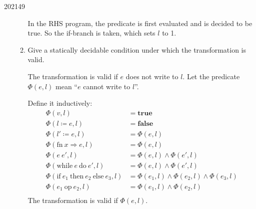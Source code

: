 \documentclass[10pt,\jkfside,a4paper]{article}
\begin{document}
\begin{examquestion}{2021}{4}{9}
\begin{enumerate}
\begin{enumerate}
In the RHS program, the predicate is first evaluated and is decided to be
true. So the if-branch is taken, which sets $l$ to 1.

\item Give a statically decidable condition under which the transformation
is valid.

The transformation is valid if $e$ does not write to $l$. Let the predicate
$\Phi(e, l)$ mean ``$e$ cannot write to $l$''.

Define it inductively:
\begin{align*}
\Phi(v, l) &= \mathbf{true} \\
\Phi(l \coloneqq e, l) &= \mathbf{false} \\
\Phi(l' \coloneqq e, l) &= \Phi(e, l) \\
\Phi(\text{fn} \ x \Rightarrow e, l) &= \Phi(e, l) \\
\Phi(e \ e', l) &= \Phi(e, l) \wedge \Phi(e', l) \\
\Phi(\text{while} \ e \ \text{do} \ e', l) &= \Phi(e, l) \wedge \Phi(e', l) \\
\Phi(\text{if} \ e_1 \ \text{then} \ e_2 \ \text{else} \ e_3, l) &=
\Phi(e_1, l) \wedge \Phi(e_2, l) \wedge \Phi(e_3, l) \\
\Phi(e_1 \ \text{op} \ e_2, l) &= \Phi(e_1, l) \wedge \Phi(e_2, l) \\
\end{align*}
The transformation is valid if $\Phi(e, l)$.

\end{enumerate}

\end{enumerate}

\end{examquestion}
\end{document}
